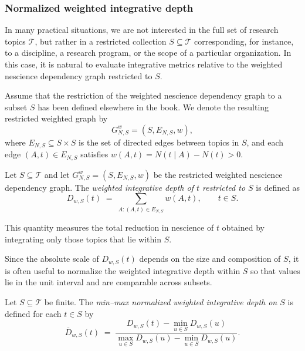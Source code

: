 \subsubsection*{Normalized weighted integrative depth}
\label{subsec:norm_weighted_integrative_depth_subset}

In many practical situations, we are not interested in the full set of research topics $\mathcal{T}$, but rather in a restricted collection $S \subseteq \mathcal{T}$ corresponding, for instance, to a discipline, a research program, or the scope of a particular organization. In this case, it is natural to evaluate integrative metrics relative to the weighted nescience dependency graph restricted to $S$.

Assume that the restriction of the weighted nescience dependency graph to a subset $S$ has been defined elsewhere in the book. We denote the resulting restricted weighted graph by
\[
G_{N,S}^w = (S, E_{N,S}, w),
\]
where $E_{N,S} \subseteq S \times S$ is the set of directed edges between topics in $S$, and each edge $(A,t)\in E_{N,S}$ satisfies $w(A,t) = N(t\mid A) - N(t) > 0$.

\begin{definition}
Let $S \subseteq \mathcal{T}$ and let $G_{N,S}^w = (S, E_{N,S}, w)$ be the restricted weighted nescience dependency graph. The \emph{weighted integrative depth of $t$ restricted to $S$} is defined as
\[
D_{w,S}(t) \;=\; \sum_{A : (A,t) \in E_{N,S}} w(A,t),
\qquad t \in S.
\]
\end{definition}

This quantity measures the total reduction in nescience of $t$ obtained by integrating only those topics that lie within $S$.

Since the absolute scale of $D_{w,S}(t)$ depends on the size and composition of $S$, it is often useful to normalize the weighted integrative depth within $S$ so that values lie in the unit interval and are comparable across subsets.

\begin{definition}
Let $S \subseteq \mathcal{T}$ be finite. The \emph{min--max normalized weighted integrative depth on $S$} is defined for each $t \in S$ by
\[
\overline{D}_{w,S}(t)
\;=\;
\frac{D_{w,S}(t) - \min_{u \in S} D_{w,S}(u)}
{\max_{u \in S} D_{w,S}(u) - \min_{u \in S} D_{w,S}(u)}.
\]
\end{definition}

